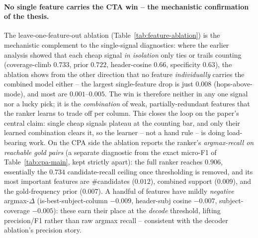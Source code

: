 \paragraph{No single feature carries the CTA win -- the mechanistic confirmation of the thesis.}
The leave-one-feature-out ablation (Table~\ref{tab:feature-ablation}) is the
mechanistic complement to the single-signal diagnostics: where the earlier analysis
showed that each cheap signal \emph{in isolation} only ties or trails counting
(coverage-climb $0.733$, prior $0.722$, header-cosine $0.66$, specificity $0.63$),
the ablation shows from the other direction that no feature \emph{individually}
carries the combined model either -- the largest single-feature drop is just
\textbf{$0.008$} (hops-above-mode), and most are $0.001$--$0.005$. The win is
therefore neither in any one signal nor a lucky pick; it is the \emph{combination} of
weak, partially-redundant features that the ranker learns to trade off per column.
This closes the loop on the paper's central claim: single cheap signals plateau at
the counting bar, and only their learned combination clears it, so the learner --
not a hand rule -- is doing load-bearing work. On the CPA side the ablation reports
the ranker's \emph{argmax-recall on reachable gold pairs} (a separate diagnostic from
the exact micro-F1 of Table~\ref{tab:cpa-main}, kept strictly apart): the full ranker
reaches $0.906$, essentially the $0.734$ candidate-recall ceiling once thresholding is
removed, and its most important features are \#candidates ($0.012$), combined support
($0.009$), and the gold-frequency prior ($0.007$). A handful of features have mildly
\emph{negative} argmax-$\Delta$ (is-best-subject-column $-0.009$, header-subj cosine
$-0.007$, subject-coverage $-0.005$): these earn their place at the \emph{decode}
threshold, lifting precision/F1 rather than raw argmax recall -- consistent with the
decoder ablation's precision story.

